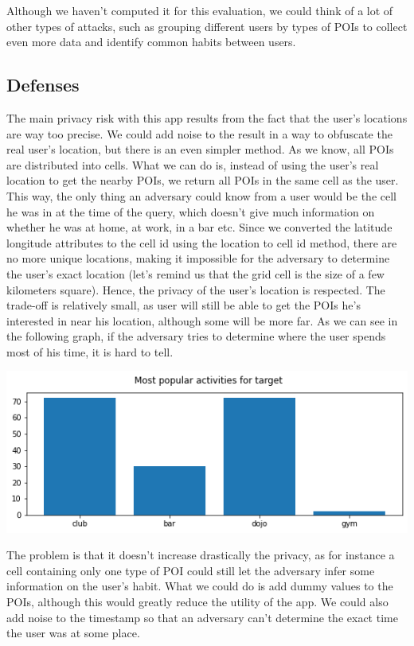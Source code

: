 \documentclass[10pt,conference,compsocconf]{IEEEtran}
\begin{document}
	Although we haven't computed it for this evaluation, we could think of a lot of other types of attacks, such as grouping different users by types of POIs to collect even more data and identify common habits between users.
	 
\subsection{Defenses}

	The main privacy risk with this app results from the fact that the user's locations are way too precise. We could add noise to the result in a way to obfuscate the real user's location, but there is an even simpler method. As we know, all POIs are distributed into cells. What we can do is, instead of using the user's real location to get the nearby POIs, we return all POIs in the same cell as the user. This way, the only thing an adversary could know from a user would be the cell he was in at the time of the query, which doesn't give much information on whether he was at home, at work, in a bar etc.
Since we converted the latitude longitude attributes to the cell id using the location to cell id method, there are no more unique locations, making it impossible for the adversary to determine the user's exact location (let's remind us that the grid cell is the size of a few kilometers square). Hence, the privacy of the user's location is respected. The trade-off is relatively small, as user will still be able to get the POIs he's interested in near his location, although some will be more far.
As we can see in the following graph, if the adversary tries to determine where the user spends most of his time, it is hard to tell.

\includegraphics[scale=0.5]{target_activities_defense}

The problem is that it doesn't increase drastically the privacy, as for instance a cell containing only one type of POI could still let the adversary infer some information on the user's habit. 
What we could do is add dummy values to the POIs, although this would greatly reduce the utility of the app. We could also add noise to the timestamp so that an adversary can't determine the exact time the user was at some place.
	 
\end{document}

